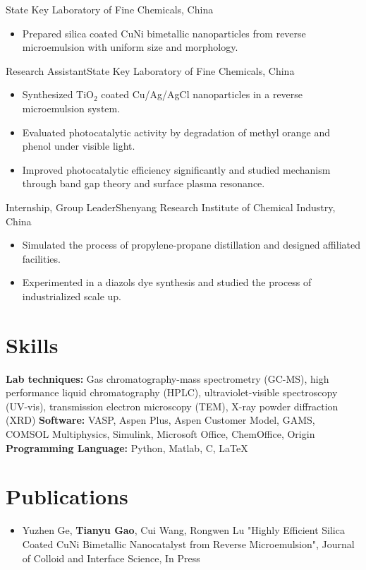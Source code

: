 \documentclass[a4paper,11pt]{article}
\begin{document}
 {State Key Laboratory of Fine Chemicals, China}{}{
 
\begin{itemize}
\item Prepared silica coated CuNi bimetallic nanoparticles from reverse microemulsion with uniform size and morphology.
\end{itemize}
}


 {Research Assistant}{State Key Laboratory of Fine Chemicals, China}{}{
 
\begin{itemize}
\item Synthesized TiO$_2$ coated Cu/Ag/AgCl nanoparticles in a reverse microemulsion system.
\item Evaluated photocatalytic activity by degradation of methyl orange and phenol under visible light.
\item Improved photocatalytic efficiency significantly and studied mechanism through band gap theory and surface plasma resonance.
\end{itemize}
}


 {Internship, Group Leader}{Shenyang Research Institute of Chemical Industry, China}{}{
\begin{itemize}
\item Simulated the process of propylene-propane distillation and designed affiliated facilities.
\item Experimented in a diazols dye synthesis and studied the process of industrialized scale up.
\end{itemize}
}


\section{Skills}

\cvitem {} { \textbf{Lab techniques:} Gas chromatography-mass spectrometry (GC-MS), high performance liquid chromatography (HPLC), ultraviolet-visible spectroscopy (UV-vis), transmission electron microscopy (TEM), X-ray powder diffraction (XRD)}
\cvitem {} {\textbf{Software:} VASP, Aspen Plus, Aspen Customer Model, GAMS, COMSOL Multiphysics, Simulink, Microsoft Office, ChemOffice, Origin}
\cvitem {} {\textbf{Programming Language:} Python, Matlab, C, \LaTeX}



\section{Publications}
\begin{itemize}
\item Yuzhen Ge, \textbf{Tianyu Gao}, Cui Wang, Rongwen Lu "Highly Efficient Silica Coated CuNi Bimetallic Nanocatalyst from Reverse Microemulsion", Journal of Colloid and Interface Science, In Press
\end{itemize}
\end{document}
